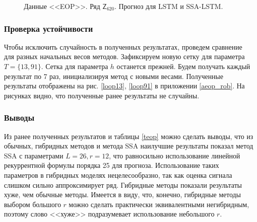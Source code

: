 \documentclass[specialist,
               substylefile = spbu.rtx,
               subf,href,colorlinks=true, 12p]{disser}
\begin{document}
\begin{figure}[H]
	\caption{Данные <<EOP>>. Ряд $\mathsf{Z}_{620}$. Прогноз для LSTM и SSA-LSTM.}
	\label{xpole_res_lstm}
\end{figure}

\subsubsection{Проверка устойчивости}

Чтобы исключить случайность в полученных результатах, проведем сравнение для разных начальных весов методов. Зафиксируем новую сетку для параметра $T = \{13, 91\}$. Сетка для параметра $h$ останется прежней. Будем получать каждый результат по 7 раз, инициализируя метод с новыми весами. Полученные результаты отображены на рис. \ref{loop13}, \ref{loop91} в приложении \ref{aeop_rob}. На рисунках видно, что полученные ранее результаты не случайны.

\subsubsection{Выводы}

Из ранее полученных результатов и таблицы \ref{teop} можно сделать выводы, что из обычных, гибридных методов и метода SSA наилучшие результаты показал метод SSA с параметрами $L = 26, r = 12$, что равносильно использование линейной рекуррентной формулы порядка 25 для прогноза. Использование таких параметров в гибридных моделях нецелесообразно, так как оценка сигнала слишком сильно аппроксимирует ряд. Гибридные методы показали результаты хуже, чем обычные методы. Имеется в виду, что, конечно, гибридные методы выбором большого $r$ можно сделать практически эквивалентными негибридным, поэтому слово <<хуже>> подразумевает использование небольшого $r$.
\end{document}
